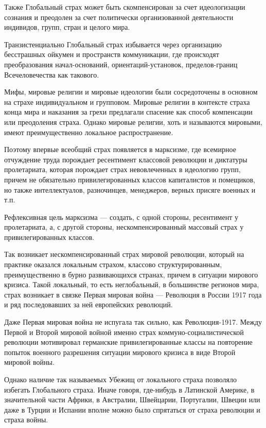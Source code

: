 Также Глобальный страх может быть скомпенсирован за счет идеологизации сознания
и преодолен за счет политически организованной деятельности индивидов, групп,
стран и целого мира.

Транзистенциально Глобальный страх избывается через организацию бесстрашных
ойкумен и пространств коммуникации, где происходят преобразования
начал-оснований, ориентаций-установок, пределов-границ Всечеловечества как
такового.

Мифы, мировые религии и мировые идеологии были сосредоточены в основном на
страхе индивидуальном и групповом. Мировые религии в контексте страха конца
мира и наказания за грехи предлагали спасение как способ компенсации или
преодоления страха. Однако мировые религии, хоть и называются мировыми, имеют
преимущественно локальное распространение.

Поэтому впервые всеобщий страх появляется в марксизме, где всемирное отчуждение
труда порождает ресентимент классовой революции и диктатуры пролетариата,
которая порождает страх невовлеченных в идеологию групп, причем не обязательно
привилегированных классов капиталистов и помещиков, но также интеллектуалов,
разночинцев, менеджеров, верных присяге военных и т.п.

Рефлексивная цель марксизма — создать, с одной стороны, ресентимент у
пролетариата, а, с другой стороны, нескомпенсированный массовый страх у
привилегированных классов.

Так возникает нескомпенсированный страх мировой революции, который на практике
оказался локальным страхом, классово структурированным, преимущественно в бурно
развивающихся странах, причем в ситуации мирового кризиса. Такой локальный, то
есть неглобальный, в большинстве регионов мира, страх возникает в связке Первая
мировая война — Революция в России 1917 года и ряд последовавших за ней
европейских революций.

Даже Первая мировая война не испугала так сильно, как Революция-1917. Между
Первой и Второй мировой войной именно страх коммуно-социалистической революции
мотивировал германские привилегированные классы на повторение попыток военного
разрешения ситуации мирового кризиса в виде Второй мировой войны.

Однако наличие так называемых Убежищ от локального страха позволяло избегать
Глобального страха. Иначе говоря, где-нибудь в Латинской Америке, в
значительной части Африки, в Австралии, Швейцарии, Португалии, Швеции или даже
в Турции и Испании вполне можно было спрятаться от страха революции и страха
войны.

